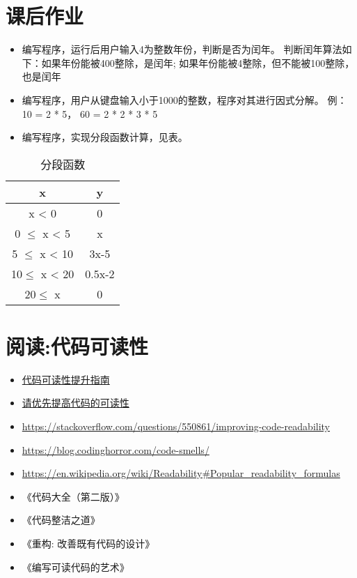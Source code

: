 \section{课后作业}
\begin{itemize}
\item 编写程序，运行后用户输入4为整数年份，判断是否为闰年。 判断闰年算法如下：如果年份能被400整除，是闰年; 如果年份能被4整除，但不能被100整除，也是闰年
\item 编写程序，用户从键盘输入小于1000的整数，程序对其进行因式分解。
  例： 10 = 2 * 5， 60 = 2 * 2 * 3 * 5
\item 编写程序，实现分段函数计算，见表。
\end{itemize}

\begin{table}
  \centering
  \begin{tabular}{cc}
    \toprule
    x           & y     \\
    \midrule
    x < 0       & 0     \\
    0 $\leq$ x < 5  & x     \\
    5 $\leq$ x < 10 & 3x-5  \\
    10$\leq$ x < 20 & 0.5x-2\\
    20$\leq$ x      & 0     \\
    \bottomrule
  \end{tabular}
  \caption{分段函数}%
  \label{segfunc}
\end{table}
\section{阅读:代码可读性}
\begin{itemize} 
\item \href{https://zhuanlan.zhihu.com/p/22334966}{代码可读性提升指南}
\item \href{http://blog.jobbole.com/73791/}{请优先提高代码的可读性}
\item \url{https://stackoverflow.com/questions/550861/improving-code-readability}
\item \url{https://blog.codinghorror.com/code-smells/}
\item \url{https://en.wikipedia.org/wiki/Readability#Popular_readability_formulas}
\item 《代码大全（第二版）》
\item 《代码整洁之道》
\item 《重构: 改善既有代码的设计》
\item 《编写可读代码的艺术》
\end{itemize}
